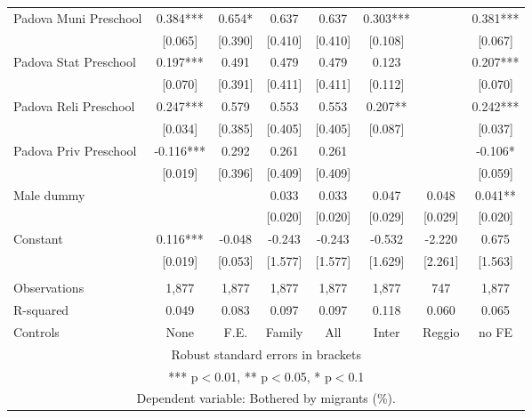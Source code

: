 \begin{tabular}{lccccccc}
Padova Muni Preschool & 0.384*** & 0.654* & 0.637 & 0.637 & 0.303*** &  & 0.381*** \\
 & [0.065] & [0.390] & [0.410] & [0.410] & [0.108] &  & [0.067] \\
Padova Stat Preschool & 0.197*** & 0.491 & 0.479 & 0.479 & 0.123 &  & 0.207*** \\
 & [0.070] & [0.391] & [0.411] & [0.411] & [0.112] &  & [0.070] \\
Padova Reli Preschool & 0.247*** & 0.579 & 0.553 & 0.553 & 0.207** &  & 0.242*** \\
 & [0.034] & [0.385] & [0.405] & [0.405] & [0.087] &  & [0.037] \\
Padova Priv Preschool & -0.116*** & 0.292 & 0.261 & 0.261 &  &  & -0.106* \\
 & [0.019] & [0.396] & [0.409] & [0.409] &  &  & [0.059] \\
Male dummy &  &  & 0.033 & 0.033 & 0.047 & 0.048 & 0.041** \\
 &  &  & [0.020] & [0.020] & [0.029] & [0.029] & [0.020] \\
Constant & 0.116*** & -0.048 & -0.243 & -0.243 & -0.532 & -2.220 & 0.675 \\
 & [0.019] & [0.053] & [1.577] & [1.577] & [1.629] & [2.261] & [1.563] \\
 &  &  &  &  &  &  &  \\
Observations & 1,877 & 1,877 & 1,877 & 1,877 & 1,877 & 747 & 1,877 \\
R-squared & 0.049 & 0.083 & 0.097 & 0.097 & 0.118 & 0.060 & 0.065 \\
 Controls & None & F.E. & Family & All & Inter & Reggio & no FE \\ \hline
\multicolumn{8}{c}{ Robust standard errors in brackets} \\
\multicolumn{8}{c}{ *** p$<$0.01, ** p$<$0.05, * p$<$0.1} \\
\multicolumn{8}{c}{ Dependent variable: Bothered by migrants (\%).} \\
\end{tabular}
